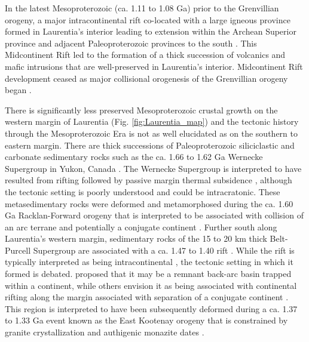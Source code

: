 \documentclass[twocolumn, switch]{article} %
\begin{document}
In the latest Mesoproterozoic (ca. 1.11 to 1.08 Ga) prior to the Grenvillian orogeny, a major intracontinental rift co-located with a large igneous province formed in Laurentia's interior leading to extension within the Archean Superior province and adjacent Paleoproterozoic provinces to the south \citep{Cannon1992b}. This Midcontinent Rift led to the formation of a thick succession of volcanics and mafic intrusions that are well-preserved in Laurentia's interior. Midcontinent Rift development ceased as major collisional orogenesis of the Grenvillian orogeny began \citep{Cannon1994a, Swanson-Hysell2019a}.

There is significantly less preserved Mesoproterozoic crustal growth on the western margin of Laurentia (Fig. \ref{fig:Laurentia_map}) and the tectonic history through the Mesoproterozoic Era is not as well elucidated as on the southern to eastern margin. There are thick successions of Paleoproterozoic siliciclastic and carbonate sedimentary rocks such as the ca. 1.66 to 1.62 Ga Wernecke Supergroup in Yukon, Canada \citep{Delaney1986a, Furlanetto2016a}. The Wernecke Supergroup is interpreted to have resulted from rifting followed by passive margin thermal subsidence \citep{Furlanetto2016a}, although the tectonic setting is poorly understood and could be intracratonic. These metasedimentary rocks were deformed and metamorphosed during the ca. 1.60 Ga Racklan-Forward orogeny that is interpreted to be associated with collision of an arc terrane and potentially a conjugate continent \citep{Thorkelson2005a, Furlanetto2013a, Furlanetto2016a}. Further south along Laurentia's western margin, sedimentary rocks of the 15 to 20 km thick Belt-Purcell Supergroup are associated with a ca. 1.47 to 1.40 rift \citep{Evans2000c}. While the rift is typically interpreted as being intracontinental \citep{Lydon2004a}, the tectonic setting in which it formed is debated. \citet{Hoffman1989c} proposed that it may be a remnant back-arc basin trapped within a continent, while others envision it as being associated with continental rifting along the margin associated with separation of a conjugate continent \citep{Jones2015a}. This region is interpreted to have been subsequently deformed during a ca. 1.37 to 1.33 Ga event known as the East Kootenay orogeny that is constrained by granite crystallization and authigenic monazite dates \citep{McMechan1982a, Nesheim2012a, McFarlane2015a}.
\end{document}
